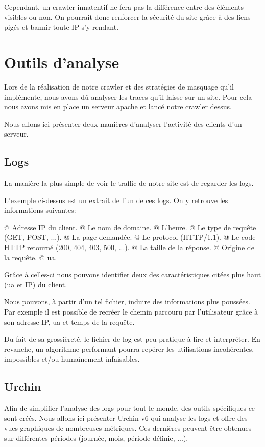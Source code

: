 \documentclass[hideweeklyreports,noposter]{polytech/polytech}
\begin{document}
            Cependant, un crawler innatentif ne fera pas la différence entre des éléments visibles ou non.
            On pourrait donc renforcer la sécurité du site grâce à des liens pigés et bannir toute IP s'y rendant.
            
    \chapter{Outils d'analyse}
    	Lors de la réalisation de notre crawler et des stratégies de masquage qu'il implémente, nous avons dû analyser les traces qu'il laisse sur un site.
    	Pour cela nous avons mis en place un serveur apache et lancé notre crawler dessus.
    	
    	Nous allons ici présenter deux manières d'analyser l'activité des clients d'un serveur.
    	
		\section{Logs}
			La manière la plus simple de voir le traffic de notre site est de regarder les logs.
			
			
			L'exemple ci-dessus est un extrait de l'un de ces logs.
			On y retrouve les informations suivantes:
			\begin{easylist}[itemize]
				@ Adresse IP du client.
				@ Le nom de domaine.
				@ L'heure.
				@ Le type de requête (GET, POST, ...).
				@ La page demandée.
				@ Le protocol (HTTP/1.1).
				@ Le code HTTP retourné (200, 404, 403, 500, ...).
				@ La taille de la réponse.
				@ Origine de la requête.
				@ \gls{ua}.
			\end{easylist}

			Grâce à celles-ci nous pouvons identifier deux des caractéristiques citées plus haut (\gls{ua} et IP) du client.
			
			Nous pouvons, à partir d'un tel fichier, induire des informations plus poussées.
			Par exemple il est possible de recréer le chemin parcouru par l'utilisateur grâce à son adresse IP, \gls{ua} et temps de la requête.
			
			Du fait de sa grossièreté, le fichier de log est peu pratique à lire et interpréter.
			En revanche, un algorithme performant pourra repérer les utilisations incohérentes, impossibles et/ou humainement infaisables.
			
		\section{Urchin}
			Afin de simplifier l'analyse des logs pour tout le monde, des outils spécifiques ce sont créés.
			Nous allons ici présenter Urchin v6 qui analyse les logs et offre des vues graphiques de nombreuses métriques.
			Ces dernières peuvent être obtenues sur différentes périodes (journée, mois, période définie, ...).
			
\end{document}
